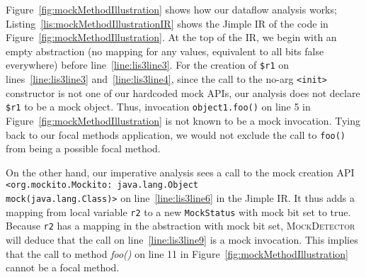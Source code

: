 Figure~\ref{fig:mockMethodIllustration} shows how our dataflow analysis works; Listing~\ref{lis:mockMethodIllustrationIR} shows the Jimple IR of the code in Figure~\ref{fig:mockMethodIllustration}. At the top of the IR, we begin with an empty abstraction (no mapping for any values, equivalent to all bits false everywhere) before line~\ref{line:lis3line3}. For the creation of \texttt{\$r1} on lines~\ref{line:lis3line3} and~\ref{line:lis3line4}, since the call to the no-arg \texttt{<init>} constructor is not one of our hardcoded mock APIs, our analysis does not declare \texttt{\$r1} to be a mock object. 
Thus, invocation \texttt{object1.foo()} on line 5 in Figure~\ref{fig:mockMethodIllustration} is not known to be a mock invocation. Tying back to our focal methods application, we would not exclude the call to \texttt{foo()} from being a possible focal method.

On the other hand, our imperative analysis sees a call to the mock creation API \texttt{<org.mockito.Mockito: java.lang.Object \\ mock(java.lang.Class)>} on line~\ref{line:lis3line6} in the Jimple IR. It thus adds a mapping from local variable \texttt{r2} to a new \texttt{MockStatus} with mock bit set to true. Because \texttt{r2} has a mapping in the abstraction with mock bit set, \textsc{MockDetector} will deduce that the call on line~\ref{line:lis3line9} is a mock invocation. This implies that the call to method \textit{foo()} on line 11 in Figure~\ref{fig:mockMethodIllustration} cannot be a focal method.


